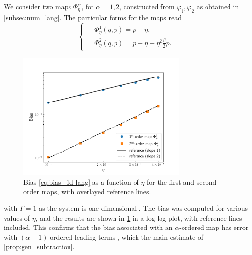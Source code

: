 We consider two maps $\Phi_\eta^\alpha$, for $\alpha=1,2$, constructed from $\varphi_1,\varphi_2$ as obtained in \cref{subsec:num_lang}.
%
%
The particular forms for the maps read
%
\begin{equation}
\begin{cases}
\begin{aligned}
	&\Phi_\eta^1(q,p) = p + \eta, \\
	&\Phi_\eta^2(q,p) = p + \eta - \eta^2\frac{\beta}{2}p.
\end{aligned}
\end{cases}
\end{equation}

\begin{figure}[ht]
	\centering
	\includegraphics[width=0.75\textwidth]{1d-lang_bias.pdf}
	\caption{Bias \eqref{eq:bias_1d-lang} as a function of $\eta$ for the first and second-order maps, with overlayed reference lines.}
	\label{fig:1d_lang_bias}
\end{figure}

with $F=1$ as the system is one-dimensional . The bias was computed for various values of $\eta$, and the results are shown in \cref{fig:1d_lang_bias} in a log-log plot, with reference lines included. This confirms that the bias associated with an $\alpha$-ordered map has error with $(\alpha+1)$-ordered leading terms , which the main estimate of \cref{prop:gen_subtraction}.


